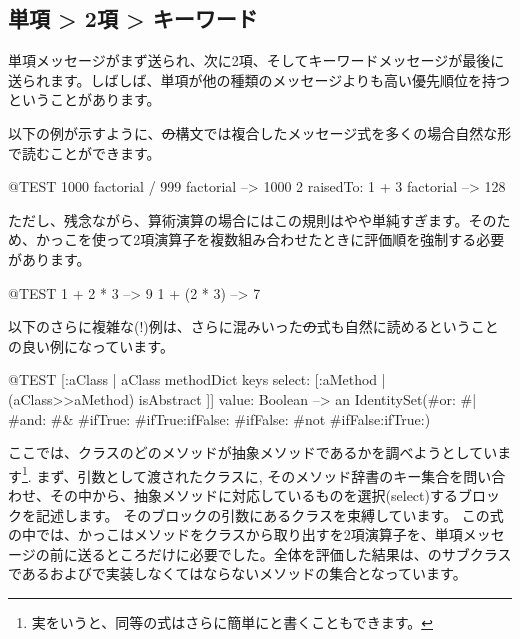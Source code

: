 \documentclass[a4paper,10pt,twoside]{book}
\begin{document}
\subsection*{単項 > 2項 > キーワード}
単項メッセージがまず送られ、次に2項、そしてキーワードメッセージが最後に送られます。しばしば、単項が他の種類のメッセージよりも高い優先順位を持つということがあります。


以下の例が示すように、\st の構文では複合したメッセージ式を多くの場合自然な形で読むことができます。
\begin{code}{@TEST}
1000 factorial / 999 factorial --> 1000
2 raisedTo: 1 + 3 factorial     --> 128
\end{code}
\noindent

ただし、残念ながら、算術演算の場合にはこの規則はやや単純すぎます。そのため、かっこを使って2項演算子を複数組み合わせたときに評価順を強制する必要があります。
\begin{code}{@TEST}
1 + 2 * 3   --> 9
1 + (2 * 3) --> 7
\end{code}

以下のさらに複雑な(!)例は、さらに混みいった\st の式も自然に読めるということの良い例になっています。
\begin{code}{@TEST}
[:aClass | aClass methodDict keys select: [:aMethod | (aClass>>aMethod) isAbstract ]] value: Boolean --> an IdentitySet(#or: #| #and: #& #ifTrue: #ifTrue:ifFalse: #ifFalse: #not #ifFalse:ifTrue:)
\end{code}
\noindent
ここでは、クラスのどのメソッドが抽象メソッドであるかを調べようとしています\footnote{実をいうと、同等の式はさらに簡単にと書くこともできます。}.
まず、引数として渡されたクラスに, そのメソッド辞書のキー集合を問い合わせ、その中から、抽象メソッドに対応しているものを選択(select)するブロックを記述します。
そのブロックの引数にあるクラスを束縛しています。
この式の中では、かっこはメソッドをクラスから取り出すを2項演算子\ct{>>}を、単項メッセージ\mbox{}の前に送るところだけに必要でした。全体を評価した結果は、のサブクラスであるおよびで実装しなくてはならないメソッドの集合となっています。
\end{document}
